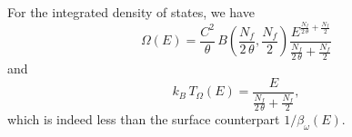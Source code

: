 \documentclass[preprint]{revtex4-1}
\begin{document}
For the integrated density of states, we have
$$
\Omega(E)
  =
  \frac{ C^2 }{ \theta } \,
  B\left( \frac{ N_f } {2 \, \theta}, \frac{ N_f } 2 \right)
  \frac{ E^{ \frac{ N_f }{2 \, \theta} + \frac{N_f}{2}  } }
  { \frac{ N_f } { 2 \, \theta } + \frac{ N_f } { 2 } }
$$
and
$$
k_B \, T_\Omega(E)
=
\frac{ E }
  { \frac{ N_f } { 2 \, \theta } + \frac{ N_f } { 2 } }
,
$$
which is indeed less than the surface counterpart $1/\beta_\omega(E)$.

%

\end{document}
